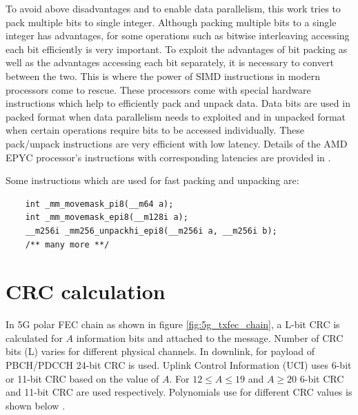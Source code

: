 To avoid above disadvantages and to enable data parallelism, this work tries to pack multiple bits to single integer. Although packing multiple bits to a single integer has advantages, for some operations such as bitwise interleaving accessing each bit efficiently is very important. To exploit the advantages of bit packing as well as the advantages accessing each bit separately, it is necessary to convert between the two. This is where the power of SIMD instructions in modern processors come to rescue. These processors come with special hardware instructions which help to efficiently pack and unpack data. Data bits are used in packed format when data parallelism needs to exploited and in unpacked format when certain operations require bits to be accessed individually. These pack/unpack instructions are very efficient with low latency. Details of the AMD EPYC processor's instructions with corresponding latencies are provided in \cite{AgnerFog}.

Some instructions which are used for fast packing and unpacking are:
\begin{code}
	\label{code:samplepackUnpack}
\begin{verbatim}
	int _mm_movemask_pi8(__m64 a);
	int _mm_movemask_epi8(__m128i a);
	__m256i _mm256_unpackhi_epi8(__m256i a, __m256i b);
	/** many more **/
\end{verbatim}
\end{code}


\section{CRC calculation}
In 5G polar FEC chain as shown in figure \ref{fig:5g_txfec_chain}, a L-bit CRC is calculated for $A$ information bits and attached to the message. Number of CRC bits (L) varies for different physical channels. In downlink, for payload of PBCH/PDCCH 24-bit CRC is used. Uplink Control Information (UCI) uses 6-bit or 11-bit CRC based on the value of $A$. For $12 \leq A \leq 19$ and $A \geq 20$ 6-bit CRC and 11-bit CRC are used respectively. Polynomials use for different CRC values is shown below \cite{3gpp.38.212}.

